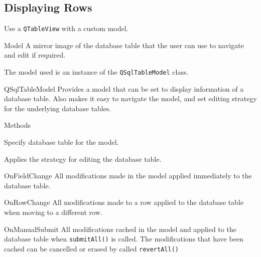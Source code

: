\documentclass[notes.tex]{subfiles}
\begin{document}
			\subsection{Displaying Rows}
				Use a \verb|QTableView| with a custom model.
				\begin{definition}{Model}
					A mirror image of the database table that the user can use to navigate and edit if required.
				\end{definition}
				The model used is an instance of the \verb|QSqlTableModel| class.
				\begin{definition}{QSqlTableModel}
					Provides a model that can be set to display information of a database table. Also makes it easy to navigate the model, and set editing strategy for the underlying database tables.
					\begin{sidenote}{Methods}
						\begin{description}[nosep, font=\texttt]
							\item[setTable()] Specify database table for the model.
							\item[setEditStrategy()] Applies the strategy for editing the database table.
								\begin{descriptimize}[nosep]
									\item[OnFieldChange] All modifications made in the model applied immediately to the database table.
									\item[OnRowChange] All modifications made to a row applied to the database table when moving to a different row.
									\item[OnManualSubmit] All modifications cached in the model and applied to the database table when \verb|submitAll()| is called. The modifications that have been cached can be cancelled or erased by called \verb|revertAll()|
								\end{descriptimize}
							\item[select()]
						\end{description}
					\end{sidenote}
				\end{definition}

\end{document}
